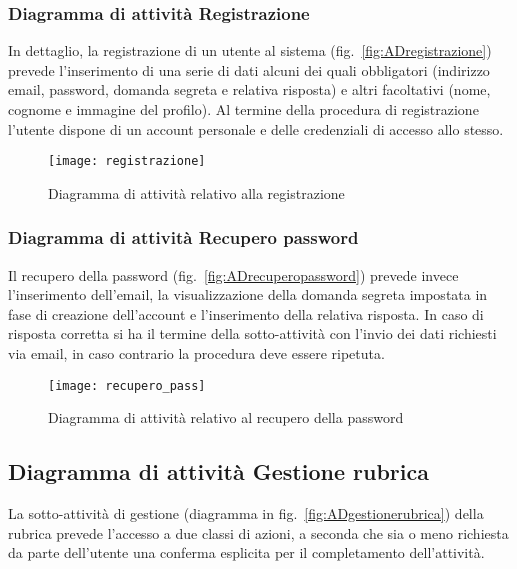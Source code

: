 \subsubsection{Diagramma di attività Registrazione}
In dettaglio, la registrazione di un utente al sistema (fig.~\vref{fig:ADregistrazione}) prevede l'inserimento di una serie di dati alcuni dei quali obbligatori (indirizzo email, password, domanda segreta e relativa risposta) e altri facoltativi (nome, cognome e immagine del profilo). Al termine della procedura di registrazione l'utente dispone di un account personale e delle credenziali di accesso allo stesso.

\begin{figure}[H]
\centering
\texttt{[image: registrazione]}
\caption{Diagramma di attività relativo alla registrazione}\label{fig:ADregistrazione}
\end{figure}

\subsubsection{Diagramma di attività Recupero password}
Il recupero della password (fig.~\vref{fig:ADrecuperopassword}) prevede invece l'inserimento dell'email, la visualizzazione della domanda segreta impostata in fase di creazione dell'account e l'inserimento della relativa risposta. In caso di risposta corretta si ha il termine della sotto-attività con l'invio dei dati richiesti via email, in caso contrario la procedura deve essere ripetuta.

\begin{figure}[H]
\centering
\texttt{[image: recupero\_pass]}
\caption{Diagramma di attività relativo al recupero della password}\label{fig:ADrecuperopassword}
\end{figure}

\subsection{Diagramma di attività Gestione rubrica}
La sotto-attività di gestione (diagramma in fig.~\vref{fig:ADgestionerubrica}) della rubrica prevede l'accesso a due classi di azioni, a seconda che sia o meno richiesta da parte dell'utente una conferma esplicita per il completamento dell'attività.

